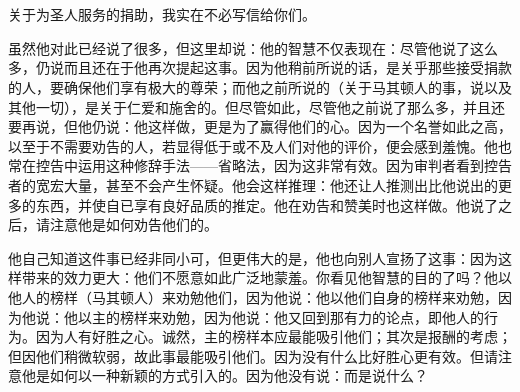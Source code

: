

\section{}


\subsection{}

关于为圣人服务的捐助，我实在不必写信给你们。\par

虽然他对此已经说了很多，但这里却说：他的智慧不仅表现在：尽管他说了这么多，仍说而且还在于他再次提起这事。因为他稍前所说的话，是关乎那些接受捐款的人，要确保他们享有极大的尊荣；而他之前所说的（关于马其顿人的事，说以及其他一切），是关于仁爱和施舍的。但尽管如此，尽管他之前说了那么多，并且还要再说，但他仍说：他这样做，更是为了赢得他们的心。因为一个名誉如此之高，以至于不需要劝告的人，若显得低于或不及人们对他的评价，便会感到羞愧。他也常在控告中运用这种修辞手法——省略法，因为这非常有效。因为审判者看到控告者的宽宏大量，甚至不会产生怀疑。他会这样推理：他还让人推测出比他说出的更多的东西，并使自已享有良好品质的推定。他在劝告和赞美时也这样做。他说了之后，请注意他是如何劝告他们的。\par

他自己知道这件事已经非同小可，但更伟大的是，他也向别人宣扬了这事：因为这样带来的效力更大：他们不愿意如此广泛地蒙羞。你看见他智慧的目的了吗？他以他人的榜样（马其顿人）来劝勉他们，因为他说：他以他们自身的榜样来劝勉，因为他说：他以主的榜样来劝勉，因为他说：他又回到那有力的论点，即他人的行为。因为人有好胜之心。诚然，主的榜样本应最能吸引他们；其次是报酬的考虑；但因他们稍微软弱，故此事最能吸引他们。因为没有什么比好胜心更有效。但请注意他是如何以一种新颖的方式引入的。因为他没有说：而是说什么？\par

